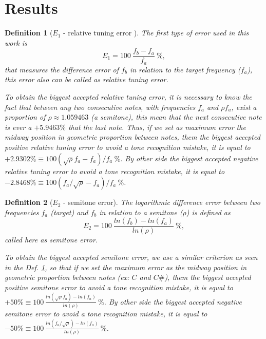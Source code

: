 \documentclass[11pt,twocolumn]{article}
\newtheorem{mydef}{Definition}[section]
\begin{document}
\section{Results}

\begin{mydef}[$E_1$ - relative tuning error ]
\label{def:max:E1}
The first type of error used in this work is 
\begin{equation}
E_1=100~\frac{f_b-f_a}{f_a}~\%,
\end{equation} 
that measures the difference error of $f_b$ in relation to the target frequency ($f_a$),
this error also can be called as relative tuning error.


To obtain the biggest accepted relative tuning error,
it is necessary to know the fact that between any two consecutive notes, with frequencies
$f_a$ and $\rho f_a$, exist a proportion of $\rho\approx 1.059463$ (a semitone), this mean
that the next consecutive note is ever a $+5.9463\%$ that the last note. Thus, 
if we set as maximum error the midway position in geometric proportion between notes, them 
the biggest accepted positive relative tuning error 
to avoid a tone recognition mistake, it is equal to $+2.9302\% \equiv 100 (\sqrt{\rho}f_a-f_a)/f_a~\%$.
By other side 
the biggest accepted negative relative tuning error 
to avoid a tone recognition mistake, it is equal to $-2.8468\% \equiv 100 (f_a/\sqrt{\rho}-f_a)/f_a~\%$.

\end{mydef}

\begin{mydef}[$E_2$ - semitone error]
\label{def:max:E2}
The logarithmic difference error between two frequencies $f_a$ (target) and $f_b$ in relation to a semitone ($\rho$) is
defined as
\begin{equation}
E_2=100~\frac{ln(f_b)-ln(f_a)}{ln(\rho)}~\%, 
\end{equation}
called here as semitone error.


To obtain the biggest accepted semitone error,
we use a similar criterion as seen in the Def. \ref{def:max:E1},
so that 
if we set the maximum error as the midway position in geometric proportion between notes (ex: $C$ and $C\#$), them 
the biggest accepted positive semitone error 
to avoid a tone recognition mistake, it is equal to $+50\% \equiv 100~\frac{ln(\sqrt{\rho} f_a)-ln(f_a)}{ln(\rho)}~\%  $.
By other side 
the biggest accepted negative semitone error 
to avoid a tone recognition mistake, it is equal to $-50\% \equiv 100~\frac{ln( f_a/\sqrt{\rho})-ln(f_a)}{ln(\rho)}~\%  $.
\end{mydef}
\end{document}
